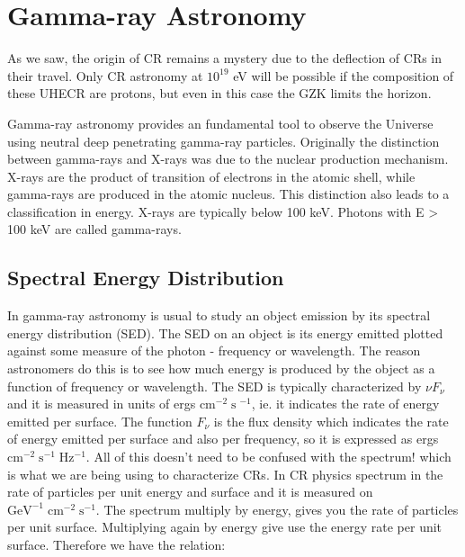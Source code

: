 \documentclass[
  letterpaper,
  DIV=11,
  numbers=noendperiod]{scrreprt}
\begin{document}
\section{Gamma-ray Astronomy}\label{gamma-ray-astronomy}

As we saw, the origin of CR remains a mystery due to the deflection of
CRs in their travel. Only CR astronomy at \(10^{19}\) eV will be
possible if the composition of these UHECR are protons, but even in this
case the GZK limits the horizon.

Gamma-ray astronomy provides an fundamental tool to observe the Universe
using neutral deep penetrating gamma-ray particles. Originally the
distinction between gamma-rays and X-rays was due to the nuclear
production mechanism. X-rays are the product of transition of electrons
in the atomic shell, while gamma-rays are produced in the atomic
nucleus. This distinction also leads to a classification in energy.
X-rays are typically below 100 keV. Photons with E \textgreater{} 100
keV are called gamma-rays.



\subsection{Spectral Energy
Distribution}\label{spectral-energy-distribution}

In gamma-ray astronomy is usual to study an object emission by its
spectral energy distribution (SED). The SED on an object is its energy
emitted plotted against some measure of the photon - frequency or
wavelength. The reason astronomers do this is to see how much energy is
produced by the object as a function of frequency or wavelength. The SED
is typically characterized by \(\nu F_\nu\) and it is measured in units
of ergs \(\mathrm{cm}^{-2}\; \mathrm{s}\;^{-1}\), ie. it indicates the
rate of energy emitted per surface. The function \(F_\nu\) is the flux
density which indicates the rate of energy emitted per surface and also
per frequency, so it is expressed as ergs
\(\mathrm{cm^{-2}\; s^{-1}\; Hz^{-1}}\). All of this doesn't need to be
confused with the spectrum! which is what we are being using to
characterize CRs. In CR physics spectrum in the rate of particles per
unit energy and surface and it is measured on
\(\mathrm{GeV^{-1}\; cm^{-2}\; s^{-1}}\). The spectrum multiply by
energy, gives you the rate of particles per unit surface. Multiplying
again by energy give use the energy rate per unit surface. Therefore we
have the relation:
\end{document}
